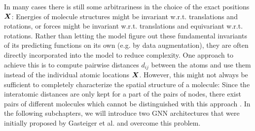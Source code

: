 In many cases there is still some arbitrariness in the choice of the 
exact positions $\boldsymbol{X}$: Energies of molecule structures might be invariant w.r.t. 
translations and rotations, or forces might be invariant w.r.t. 
translations and equivariant w.r.t. rotations. Rather than letting the model figure out
these fundamental invariants of its predicting functions on its own (e.g. by 
data augmentation), they are often directly incorporated into the model to reduce 
complexity. One approach to achieve this is to compute pairwise distances $d_{ij}$ 
between the atoms and use them instead of the individual atomic locations $\boldsymbol{X}$. 
However, this might
not always be sufficient to completely characterize the spatial structure of a molecule:
Since the interatomic distances are only kept for a part of the pairs of 
nodes, there exist pairs of different molecules which cannot be
distinguished with this approach \cite[Appendix A]{DBLP:journals/corr/abs-2003-03123}.
In the following subchapters, we will introduce two GNN architectures that were initially
proposed by Gasteiger et al. and overcome this problem.




